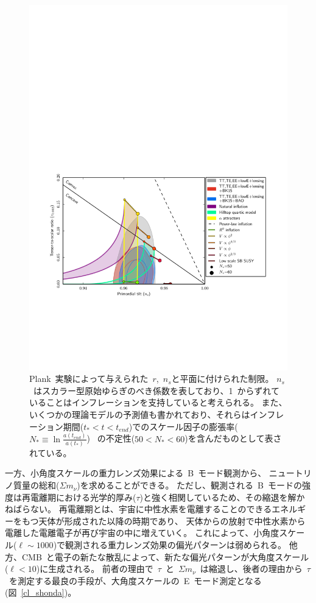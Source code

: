 \begin{figure}[htbp]
  \centering
  \includegraphics[width=1\columnwidth]{2_cosmology/figs/plank_r.pdf}
  \caption{Plank~実験によって与えられた~$r$,~$n_s$と平面に付けられた制限\cite{plank}。
  $n_s$~はスカラー型原始ゆらぎのべき係数を表しており、1~からずれていることはインフレーションを支持していると考えられる。
  また、いくつかの理論モデルの予測値も書かれており、それらはインフレーション期間($t_{*}<t<t_{end}$)でのスケール因子の膨張率($N_* \equiv \ln\frac{a(t_{end})}{a(t_*)}$)~
  の不定性($50<N_*<60$)を含んだものとして表されている。}
  \label{ebmode2}
\end{figure}


一方、小角度スケールの重力レンズ効果による~B~モード観測から、
ニュートリノ質量の総和($\Sigma m_{\nu}$)を求めることができる。
ただし、観測される~B~モードの強度は再電離期における光学的厚み($\tau$)と強く相関しているため、その縮退を解かねばらない。
再電離期とは、宇宙に中性水素を電離することのできるエネルギーをもつ天体が形成された以降の時期であり、
天体からの放射で中性水素から電離した電離電子が再び宇宙の中に増えていく。
これによって、小角度スケール($\ell \sim 1000$)で観測される重力レンズ効果の偏光パターンは弱められる。
他方、CMB~と電子の新たな散乱によって、新たな偏光パターンが大角度スケール($\ell < 10$)に生成される。
前者の理由で~$\tau$~と~$\Sigma m_{\nu}$~は縮退し、後者の理由から~$\tau$~を測定する最良の手段が、大角度スケールの~E~モード測定となる(図~\ref{cl_shonda})。

